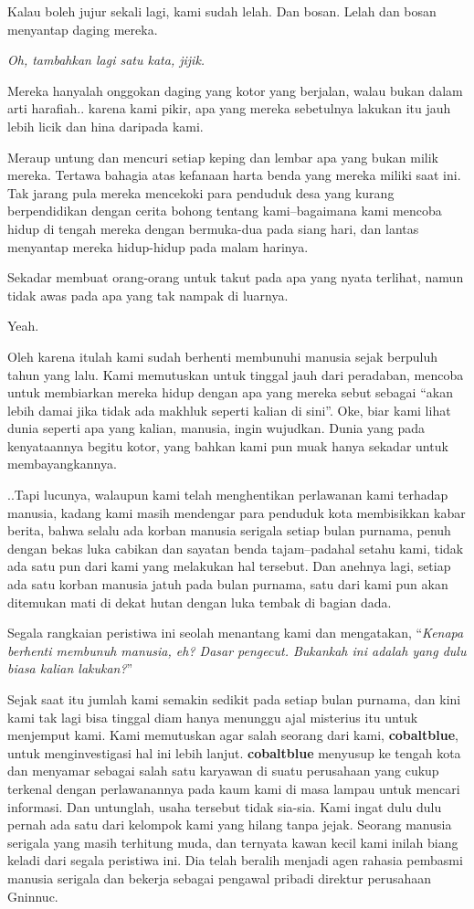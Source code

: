 \documentclass[]{book}
\begin{document}
Kalau boleh jujur sekali lagi, kami sudah lelah. Dan bosan. Lelah dan
bosan menyantap daging mereka.

\emph{Oh, tambahkan lagi satu kata, jijik.}

Mereka hanyalah onggokan daging yang kotor yang berjalan, walau bukan
dalam arti harafiah.. karena kami pikir, apa yang mereka sebetulnya
lakukan itu jauh lebih licik dan hina daripada kami.

Meraup untung dan mencuri setiap keping dan lembar apa yang bukan milik
mereka. Tertawa bahagia atas kefanaan harta benda yang mereka miliki
saat ini. Tak jarang pula mereka mencekoki para penduduk desa yang
kurang berpendidikan dengan cerita bohong tentang kami--bagaimana kami
mencoba hidup di tengah mereka dengan bermuka-dua pada siang hari, dan
lantas menyantap mereka hidup-hidup pada malam harinya.

Sekadar membuat orang-orang untuk takut pada apa yang nyata terlihat,
namun tidak awas pada apa yang tak nampak di luarnya.

Yeah.

Oleh karena itulah kami sudah berhenti membunuhi manusia sejak berpuluh
tahun yang lalu. Kami memutuskan untuk tinggal jauh dari peradaban,
mencoba untuk membiarkan mereka hidup dengan apa yang mereka sebut
sebagai ``akan lebih damai jika tidak ada makhluk seperti kalian di
sini''. Oke, biar kami lihat dunia seperti apa yang kalian, manusia,
ingin wujudkan. Dunia yang pada kenyataannya begitu kotor, yang bahkan
kami pun muak hanya sekadar untuk membayangkannya.

..Tapi lucunya, walaupun kami telah menghentikan perlawanan kami
terhadap manusia, kadang kami masih mendengar para penduduk kota
membisikkan kabar berita, bahwa selalu ada korban manusia serigala
setiap bulan purnama, penuh dengan bekas luka cabikan dan sayatan benda
tajam--padahal setahu kami, tidak ada satu pun dari kami yang melakukan
hal tersebut. Dan anehnya lagi, setiap ada satu korban manusia jatuh
pada bulan purnama, satu dari kami pun akan ditemukan mati di dekat
hutan dengan luka tembak di bagian dada.

Segala rangkaian peristiwa ini seolah menantang kami dan mengatakan,
``\emph{Kenapa berhenti membunuh manusia, eh? Dasar pengecut. Bukankah
ini adalah yang dulu biasa kalian lakukan?}''

Sejak saat itu jumlah kami semakin sedikit pada setiap bulan purnama,
dan kini kami tak lagi bisa tinggal diam hanya menunggu ajal misterius
itu untuk menjemput kami. Kami memutuskan agar salah seorang dari kami,
\textbf{cobaltblue}, untuk menginvestigasi hal ini lebih lanjut.
\textbf{cobaltblue} menyusup ke tengah kota dan menyamar sebagai salah
satu karyawan di suatu perusahaan yang cukup terkenal dengan
perlawanannya pada kaum kami di masa lampau untuk mencari informasi. Dan
untunglah, usaha tersebut tidak sia-sia. Kami ingat dulu dulu pernah ada
satu dari kelompok kami yang hilang tanpa jejak. Seorang manusia
serigala yang masih terhitung muda, dan ternyata kawan kecil kami inilah
biang keladi dari segala peristiwa ini. Dia telah beralih menjadi agen
rahasia pembasmi manusia serigala dan bekerja sebagai pengawal pribadi
direktur perusahaan Gninnuc.
\end{document}
